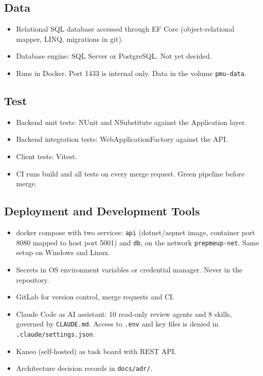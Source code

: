 \documentclass[a4paper,11pt]{article}
\begin{document}
\subsection{Data}
\begin{itemize}
    \item Relational SQL database accessed through EF Core (object-relational mapper, LINQ, migrations in git).
    \item Database engine: SQL Server or PostgreSQL. Not yet decided.
    \item Runs in Docker. Port 1433 is internal only. Data in the volume \texttt{pmu-data}.
\end{itemize}

\subsection{Test}
\begin{itemize}
    \item Backend unit tests: NUnit and NSubstitute against the Application layer.
    \item Backend integration tests: WebApplicationFactory against the API.
    \item Client tests: Vitest.
    \item CI runs build and all tests on every merge request. Green pipeline before merge.
\end{itemize}

\subsection{Deployment and Development Tools}
\begin{itemize}
    \item docker compose with two services: \texttt{api} (dotnet/aspnet image, container port 8080 mapped to host port 5001) and \texttt{db}, on the network \texttt{prepmeup-net}. Same setup on Windows and Linux.
    \item Secrets in OS environment variables or credential manager. Never in the repository.
    \item GitLab for version control, merge requests and CI.
    \item Claude Code as AI assistant: 10 read-only review agents and 8 skills, governed by \texttt{CLAUDE.md}. Access to \texttt{.env} and key files is denied in \texttt{.claude/settings.json}.
    \item Kaneo (self-hosted) as task board with REST API.
    \item Architecture decision records in \texttt{docs/adr/}.
\end{itemize}
\end{document}
